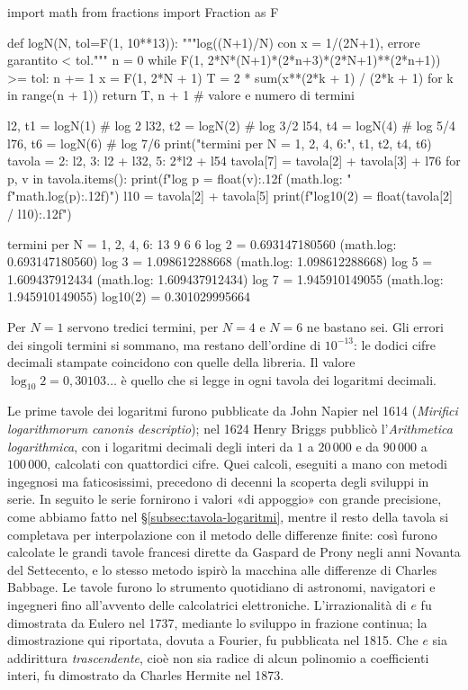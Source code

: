 \begin{python}
import math
from fractions import Fraction as F

def logN(N, tol=F(1, 10**13)):
    """log((N+1)/N) con x = 1/(2N+1), errore garantito < tol."""
    n = 0
    while F(1, 2*N*(N+1)*(2*n+3)*(2*N+1)**(2*n+1)) >= tol:
        n += 1
    x = F(1, 2*N + 1)
    T = 2 * sum(x**(2*k + 1) / (2*k + 1) for k in range(n + 1))
    return T, n + 1                  # valore e numero di termini

l2, t1 = logN(1)                     # log 2
l32, t2 = logN(2)                    # log 3/2
l54, t4 = logN(4)                    # log 5/4
l76, t6 = logN(6)                    # log 7/6
print("termini per N = 1, 2, 4, 6:", t1, t2, t4, t6)
tavola = {2: l2, 3: l2 + l32, 5: 2*l2 + l54}
tavola[7] = tavola[2] + tavola[3] + l76
for p, v in tavola.items():
    print(f"log {p} = {float(v):.12f}   (math.log: "
          f"{math.log(p):.12f})")
l10 = tavola[2] + tavola[5]
print(f"log10(2) = {float(tavola[2] / l10):.12f}")
\end{python}
\begin{risultato}
termini per N = 1, 2, 4, 6: 13 9 6 6
log 2 = 0.693147180560   (math.log: 0.693147180560)
log 3 = 1.098612288668   (math.log: 1.098612288668)
log 5 = 1.609437912434   (math.log: 1.609437912434)
log 7 = 1.945910149055   (math.log: 1.945910149055)
log10(2) = 0.301029995664
\end{risultato}

Per $N=1$ servono tredici termini, per $N=4$ e $N=6$ ne bastano sei. Gli errori dei
singoli termini si sommano, ma restano dell'ordine di $10^{-13}$: le dodici cifre decimali
stampate coincidono con quelle della libreria. Il valore $\log_{10}2=0{,}30103\ldots$ è quello
che si legge in ogni tavola dei logaritmi decimali.

\begin{notastorica}
Le prime tavole dei logaritmi furono pubblicate da John Napier nel 1614 (\emph{Mirifici
logarithmorum canonis descriptio}); nel 1624 Henry Briggs pubblicò l'\emph{Arithmetica
logarithmica}, con i logaritmi decimali degli interi da $1$ a $20\,000$ e da $90\,000$ a
$100\,000$, calcolati con quattordici cifre. Quei calcoli, eseguiti a mano con metodi
ingegnosi ma faticosissimi, precedono di decenni la scoperta degli sviluppi in serie.
In seguito le serie fornirono i valori «di appoggio» con grande precisione, come
abbiamo fatto nel \S\ref{subsec:tavola-logaritmi}, mentre il
resto della tavola si completava per interpolazione con il metodo delle differenze
finite: così furono calcolate le grandi tavole francesi dirette da Gaspard de Prony
negli anni Novanta del Settecento, e lo stesso metodo ispirò la macchina alle differenze
di Charles Babbage. Le tavole furono lo strumento quotidiano di astronomi, navigatori e
ingegneri fino all'avvento delle calcolatrici elettroniche. L'irrazionalità
di $e$ fu dimostrata da Eulero nel 1737, mediante lo sviluppo in frazione continua; la
dimostrazione qui riportata, dovuta a Fourier, fu pubblicata nel 1815. Che $e$ sia
addirittura \emph{trascendente}, cioè non sia radice di alcun polinomio a coefficienti
interi, fu dimostrato da Charles Hermite nel 1873.
\end{notastorica}
